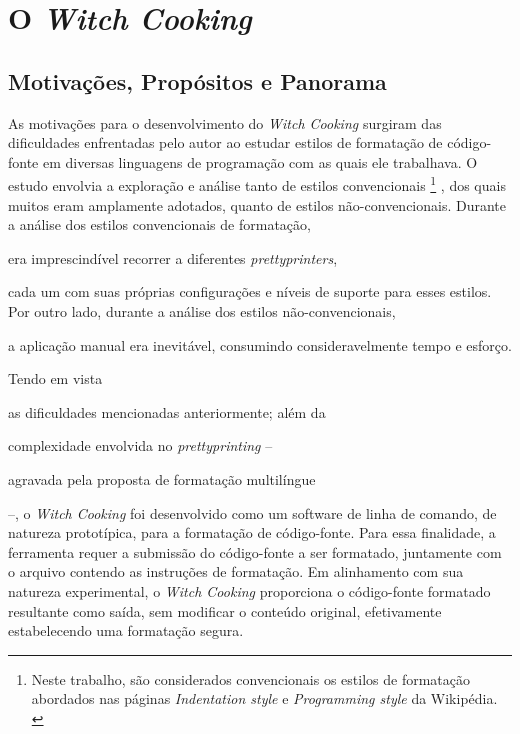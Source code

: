 \documentclass
 [11pt,a4paper,english,brazil,openright,sumario=tradicional,twoside]
 {abntex2}
\newcommand{\witchcooking}{\textit{Witch Cooking}\xspace}
\begin{document}

 \chapter{O \witchcooking}

 \section{Motivações, Propósitos e Panorama}

 As motivações para o desenvolvimento do \witchcooking surgiram das
 dificuldades enfrentadas pelo autor ao estudar estilos de formatação de
 código-fonte em diversas linguagens de programação com as quais ele
 trabalhava. O estudo envolvia a exploração e análise tanto de estilos
 convencionais%
 \footnote
  {Neste trabalho, são considerados convencionais os estilos de formatação
   abordados nas páginas \textit{Indentation style} e
   \textit{Programming style} da Wikipédia.
   \cites{wiki-2023-indentation}{wiki-2023-programming}}%
 , dos quais muitos eram amplamente adotados, quanto de estilos
 não-convencionais. Durante a análise dos estilos convencionais de formatação,
 \begin{inparaenum}
  \item era imprescindível recorrer a diferentes \textit{prettyprinters},
  \item cada um com suas próprias configurações e níveis de suporte para esses
        estilos. Por outro lado, durante a análise dos estilos
        não-convencionais,
  \item a aplicação manual era inevitável, consumindo consideravelmente tempo e
        esforço.
 \end{inparaenum}

 Tendo em vista
 \begin{inparaenum}
  \item as dificuldades mencionadas anteriormente; além da
  \item complexidade envolvida no \textit{prettyprinting} --
  \item agravada pela proposta de formatação multilíngue
 \end{inparaenum}
 --, o \witchcooking foi desenvolvido como um software de linha de comando, de
 natureza prototípica, para a formatação de código-fonte. Para essa finalidade,
 a ferramenta requer a submissão do código-fonte a ser formatado, juntamente
 com o arquivo contendo as instruções de formatação. Em alinhamento com sua
 natureza experimental, o \witchcooking proporciona o código-fonte formatado
 resultante como saída, sem modificar o conteúdo original, efetivamente
 estabelecendo uma formatação segura.
\end{document}
